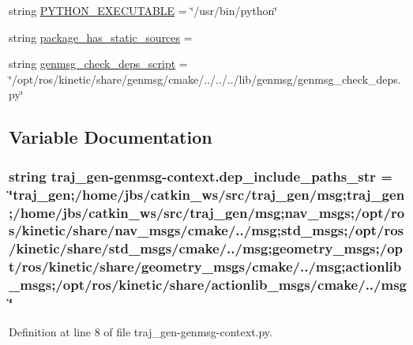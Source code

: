 \begin{DoxyCompactItemize}
\item 
string \hyperlink{namespacetraj__gen-genmsg-context_a35a5b37a567194e82b36cfe55c253a92}{P\+Y\+T\+H\+O\+N\+\_\+\+E\+X\+E\+C\+U\+T\+A\+B\+LE} = \char`\"{}/usr/bin/python\char`\"{}
\item 
string \hyperlink{namespacetraj__gen-genmsg-context_af35b61303a0f549aa91143caa757dcae}{package\+\_\+has\+\_\+static\+\_\+sources} = \textquotesingle{}\textquotesingle{}
\item 
string \hyperlink{namespacetraj__gen-genmsg-context_a3ed92e9c7478bb9c31ce3ba8d513b7e0}{genmsg\+\_\+check\+\_\+deps\+\_\+script} = \char`\"{}/opt/ros/kinetic/share/genmsg/cmake/../../../lib/genmsg/genmsg\+\_\+check\+\_\+deps.\+py\char`\"{}
\end{DoxyCompactItemize}


\subsection{Variable Documentation}
\subsubsection[{\texorpdfstring{dep\+\_\+include\+\_\+paths\+\_\+str}{dep_include_paths_str}}]{\setlength{\rightskip}{0pt plus 5cm}string traj\+\_\+gen-\/genmsg-\/context.\+dep\+\_\+include\+\_\+paths\+\_\+str = \char`\"{}traj\+\_\+gen;/home/jbs/catkin\+\_\+ws/src/traj\+\_\+gen/msg;traj\+\_\+gen;/home/jbs/catkin\+\_\+ws/src/traj\+\_\+gen/msg;{\bf nav\+\_\+msgs};/opt/ros/kinetic/share/{\bf nav\+\_\+msgs}/cmake/../msg;std\+\_\+msgs;/opt/ros/kinetic/share/std\+\_\+msgs/cmake/../msg;{\bf geometry\+\_\+msgs};/opt/ros/kinetic/share/{\bf geometry\+\_\+msgs}/cmake/../msg;actionlib\+\_\+msgs;/opt/ros/kinetic/share/actionlib\+\_\+msgs/cmake/../msg\char`\"{}}\hypertarget{namespacetraj__gen-genmsg-context_abb5ac73d6c4fb1f9bd9518957d727d36}{}\label{namespacetraj__gen-genmsg-context_abb5ac73d6c4fb1f9bd9518957d727d36}


Definition at line 8 of file traj\+\_\+gen-\/genmsg-\/context.\+py.

